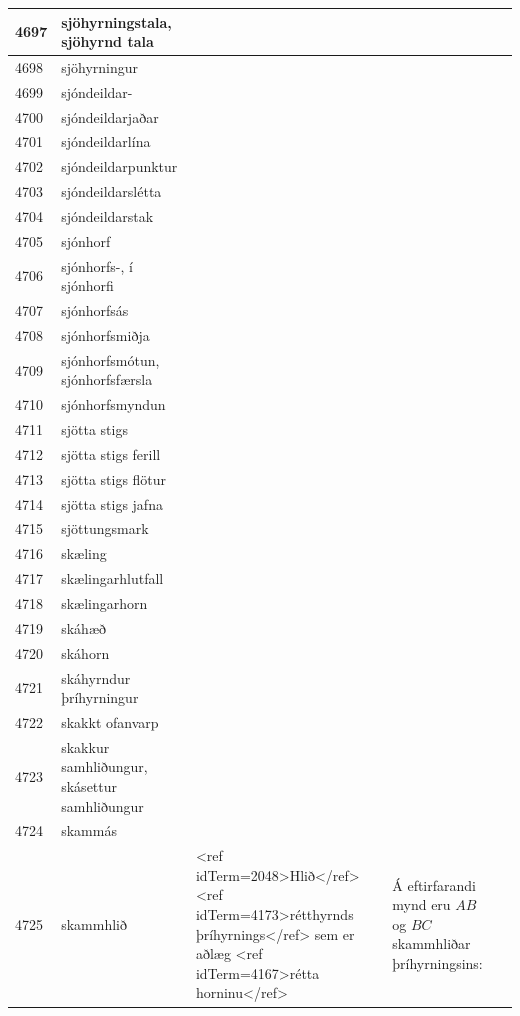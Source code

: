 \begin{longtable}{p{}|p{}|p{}|p{}|p{}}
\hline
4697 & sjöhyrningstala, sjöhyrnd tala &  &  &  \\
\hline
4698 & sjöhyrningur &  &  &  \\
\hline
4699 & sjóndeildar- &  &  &  \\
\hline
4700 & sjóndeildarjaðar &  &  &  \\
\hline
4701 & sjóndeildarlína &  &  &  \\
\hline
4702 & sjóndeildarpunktur &  &  &  \\
\hline
4703 & sjóndeildarslétta &  &  &  \\
\hline
4704 & sjóndeildarstak &  &  &  \\
\hline
4705 & sjónhorf &  &  &  \\
\hline
4706 & sjónhorfs-, í sjónhorfi &  &  &  \\
\hline
4707 & sjónhorfsás &  &  &  \\
\hline
4708 & sjónhorfsmiðja &  &  &  \\
\hline
4709 & sjónhorfsmótun, sjónhorfsfærsla &  &  &  \\
\hline
4710 & sjónhorfsmyndun &  &  &  \\
\hline
4711 & sjötta stigs &  &  &  \\
\hline
4712 & sjötta stigs ferill &  &  &  \\
\hline
4713 & sjötta stigs flötur &  &  &  \\
\hline
4714 & sjötta stigs jafna &  &  &  \\
\hline
4715 & sjöttungsmark &  &  &  \\
\hline
4716 & skæling &  &  &  \\
\hline
4717 & skælingarhlutfall &  &  &  \\
\hline
4718 & skælingarhorn &  &  &  \\
\hline
4719 & skáhæð &  &  &  \\
\hline
4720 & skáhorn &  &  &  \\
\hline
4721 & skáhyrndur þríhyrningur &  &  &  \\
\hline
4722 & skakkt ofanvarp &  &  &  \\
\hline
4723 & skakkur samhliðungur, skásettur samhliðungur &  &  &  \\
\hline
4724 & skammás &  &  &  \\
\hline
4725 & skammhlið & <ref idTerm=2048>Hlið</ref> <ref idTerm=4173>rétthyrnds þríhyrnings</ref> sem er aðlæg <ref idTerm=4167>rétta horninu</ref> & Á eftirfarandi mynd eru $AB$ og $BC$ skammhliðar þríhyrningsins:


\end{longtable}
